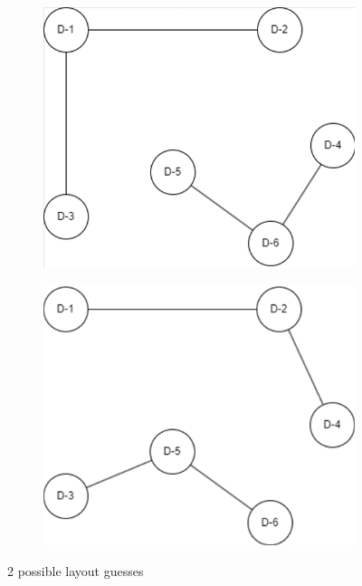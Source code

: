 \begin{figure}[htbp]
    \centering
    \begin{subfigure}[b]{0.38\textwidth}
        \centering
        \includegraphics[width=\textwidth]{images/layoutguess1.png}
    \end{subfigure}
    \hfill
    \begin{subfigure}[b]{0.38\textwidth}
        \centering
        \includegraphics[width=\textwidth]{images/layoutguess2.png}
    \end{subfigure}
    \caption{2 possible layout guesses}
    \label{fig:layoutguesses}
\end{figure}

